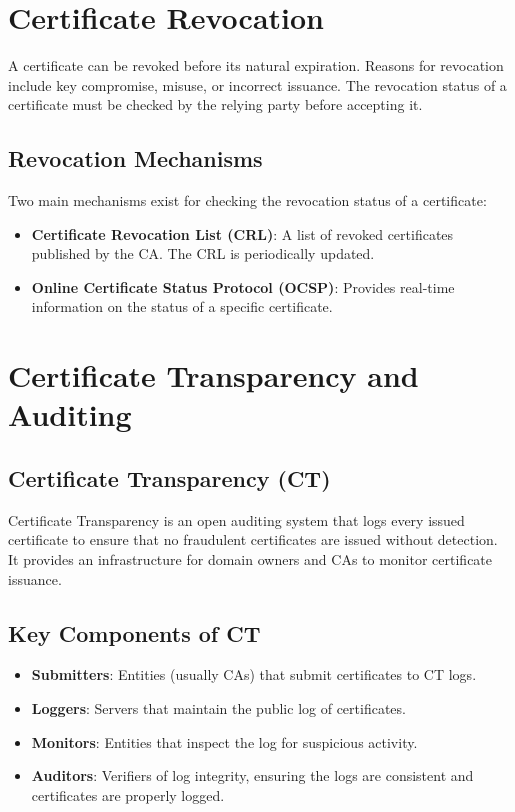 \section{Certificate Revocation}
A certificate can be revoked before its natural expiration. Reasons for revocation include key compromise, misuse, or incorrect issuance. The revocation status of a certificate must be checked by the relying party before accepting it.

\subsection{Revocation Mechanisms}
Two main mechanisms exist for checking the revocation status of a certificate:
\begin{itemize}
    \item \textbf{Certificate Revocation List (CRL)}: A list of revoked certificates published by the CA. The CRL is periodically updated.
    \item \textbf{Online Certificate Status Protocol (OCSP)}: Provides real-time information on the status of a specific certificate.
\end{itemize}

\section{Certificate Transparency and Auditing}
\subsection{Certificate Transparency (CT)}
Certificate Transparency is an open auditing system that logs every issued certificate to ensure that no fraudulent certificates are issued without detection. It provides an infrastructure for domain owners and CAs to monitor certificate issuance.

\subsection{Key Components of CT}
\begin{itemize}
    \item \textbf{Submitters}: Entities (usually CAs) that submit certificates to CT logs.
    \item \textbf{Loggers}: Servers that maintain the public log of certificates.
    \item \textbf{Monitors}: Entities that inspect the log for suspicious activity.
    \item \textbf{Auditors}: Verifiers of log integrity, ensuring the logs are consistent and certificates are properly logged.
\end{itemize}

